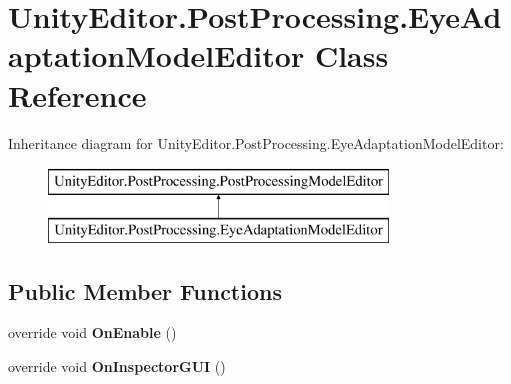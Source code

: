 \hypertarget{class_unity_editor_1_1_post_processing_1_1_eye_adaptation_model_editor}{}\section{Unity\+Editor.\+Post\+Processing.\+Eye\+Adaptation\+Model\+Editor Class Reference}
\label{class_unity_editor_1_1_post_processing_1_1_eye_adaptation_model_editor}
Inheritance diagram for Unity\+Editor.\+Post\+Processing.\+Eye\+Adaptation\+Model\+Editor\+:\begin{figure}[H]
\begin{center}
\leavevmode
\includegraphics[height=2.000000cm]{class_unity_editor_1_1_post_processing_1_1_eye_adaptation_model_editor}
\end{center}
\end{figure}
\subsection*{Public Member Functions}
\begin{DoxyCompactItemize}
\item 
\mbox{\label{class_unity_editor_1_1_post_processing_1_1_eye_adaptation_model_editor_a9d480e9449494f870ac0ce711fce6091}} 
override void {\bfseries On\+Enable} ()
\item 
\mbox{\label{class_unity_editor_1_1_post_processing_1_1_eye_adaptation_model_editor_a4cf6a60dd7701b19aeda57e557f44cee}} 
override void {\bfseries On\+Inspector\+G\+UI} ()
\end{DoxyCompactItemize}
